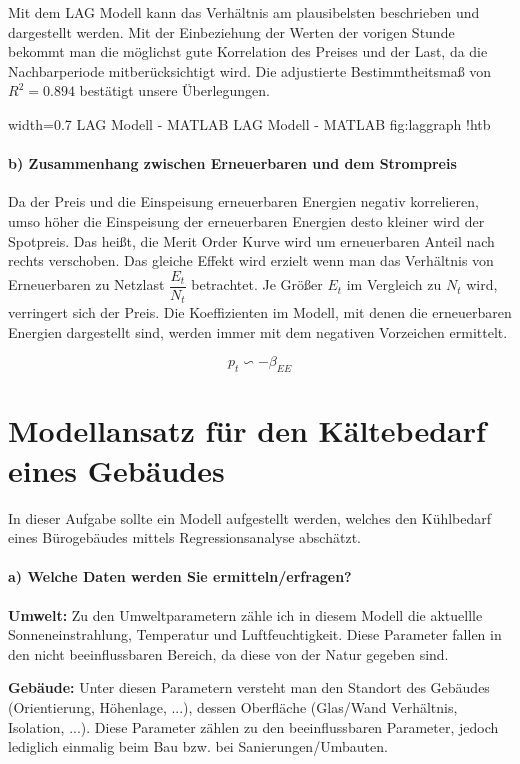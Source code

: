 \documentclass{eegreport}
\begin{document}
Mit dem LAG Modell kann das Verhältnis am plausibelsten beschrieben und dargestellt werden. Mit der Einbeziehung der Werten der vorigen Stunde bekommt man die möglichst gute Korrelation des Preises und der Last, da die Nachbarperiode mitberücksichtigt wird. Die adjustierte Bestimmtheitsmaß von $R^2 = 0.894$ bestätigt unsere Überlegungen.

{width=0.7\linewidth}
{LAG Modell - MATLAB}
{LAG Modell - MATLAB}
{fig:laggraph}
{!htb}

\newpage
\paragraph{b) Zusammenhang zwischen Erneuerbaren und dem Strompreis}

Da der Preis und die Einspeisung erneuerbaren Energien negativ korrelieren, umso höher die Einspeisung der erneuerbaren Energien desto kleiner wird der Spotpreis. Das heißt, die Merit Order Kurve wird um erneuerbaren Anteil nach rechts verschoben. Das gleiche Effekt wird erzielt wenn man das Verhältnis von Erneuerbaren zu Netzlast $\dfrac{E_t}{N_t}$ betrachtet. Je Größer $E_t$ im Vergleich zu $N_t$ wird, verringert sich der Preis. Die Koeffizienten im Modell, mit denen die erneuerbaren Energien dargestellt sind, werden immer mit dem negativen Vorzeichen ermittelt.

\begin{equation}
p_t \backsim -\beta_{EE}
\end{equation}


\newpage
\section{Modellansatz für den Kältebedarf eines Gebäudes}
In dieser Aufgabe sollte ein Modell aufgestellt werden, welches den Kühlbedarf eines Bürogebäudes mittels Regressionsanalyse abschätzt.

\paragraph{a) Welche Daten werden Sie ermitteln/erfragen?}
\mbox{}\newline \newline
\textbf{Umwelt:} Zu den Umweltparametern zähle ich in diesem Modell die aktuellle  Sonneneinstrahlung, Temperatur und Luftfeuchtigkeit. Diese Parameter fallen in den nicht beeinflussbaren Bereich, da diese von der Natur gegeben sind.

\textbf{Gebäude:} Unter diesen Parametern versteht man den Standort des Gebäudes (Orientierung, Höhenlage, ...), dessen Oberfläche (Glas/Wand Verhältnis, Isolation, ...). Diese Parameter zählen zu den beeinflussbaren Parameter, jedoch lediglich einmalig beim Bau bzw. bei Sanierungen/Umbauten.
\end{document}
